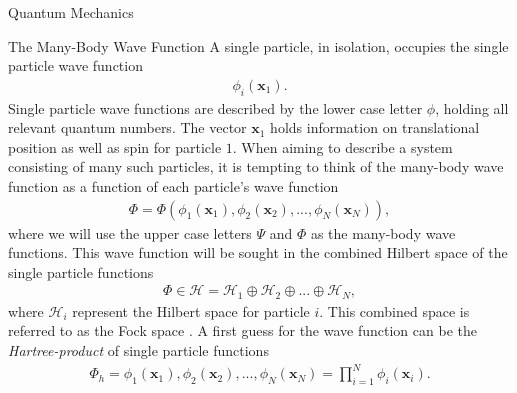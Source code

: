 \documentclass[twoside,english]{uiofysmaster}
\begin{document}
\begin{chapter}{Quantum Mechanics}
 	\begin{section}{The Many-Body Wave Function}
 		A single particle, in isolation, occupies the single particle wave function \cite{Audun,Crawford}
 		\begin{align}
 			\phi_i(\mathbf{x}_1). 
 		\end{align}
 		Single particle wave functions are described by the lower case letter $\phi$, holding all relevant quantum numbers. The vector $\mathbf{x}_1$ holds information on translational position as well as spin for particle $1$. When aiming to describe a system consisting of many such particles, it is tempting to think of the many-body wave function as a function of each particle's wave function 
 		\begin{align}
 			\Phi = \Phi( \phi_1(\mathbf{x}_1), \phi_2(\mathbf{x}_2), ..., \phi_N(\mathbf{x}_N) ),
 		\end{align}
 		where we will use the upper case letters $\Psi$ and $\Phi$ as the many-body wave functions. This wave function will be sought in the combined Hilbert space of the single particle functions \cite{MHJSlides}
 		\begin{align}
 			\Phi \in \mathcal{H} = \mathcal{H}_1 \oplus \mathcal{H}_2 \oplus ... \oplus \mathcal{H}_N,
 		\end{align}
 		where $\mathcal{H}_i$ represent the Hilbert space for particle $i$. This combined space is referred to as the Fock space \cite{MHJSlides}. A first guess for the wave function can be the \textit{Hartree-product} of single particle functions \cite{Audun,ShavittAndBartlett,Szabo} 
 		\begin{align}
 			\Phi_h = \phi_1(\mathbf{x}_1), \phi_2(\mathbf{x}_2), ..., \phi_N(\mathbf{x}_N) = \prod_{i=1}^N \phi_i(\mathbf{x}_i).
 		\end{align}

 	\end{section}


\end{chapter}
\end{document}
